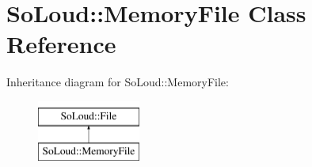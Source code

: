 \hypertarget{class_so_loud_1_1_memory_file}{}\section{So\+Loud\+::Memory\+File Class Reference}
\label{class_so_loud_1_1_memory_file}
Inheritance diagram for So\+Loud\+::Memory\+File\+:\begin{figure}[H]
\begin{center}
\leavevmode
\includegraphics[height=2.000000cm]{class_so_loud_1_1_memory_file}
\end{center}
\end{figure}
